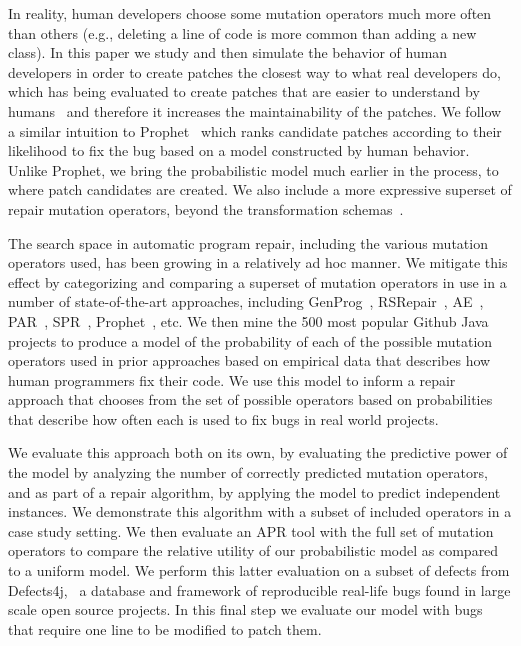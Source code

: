 \documentclass[conference]{IEEEtran}
\begin{document}
In reality, human developers choose some mutation operators 
much more often than 
others (e.g., deleting a line of code is more common than adding a new class). In this paper we study and then simulate the behavior of human developers in order 
to create patches the closest way to what real developers do, which has 
being evaluated to create patches that are easier to understand by
humans~\cite{kim2013} and 
therefore it increases the maintainability of the patches. We follow a similar
intuition to Prophet~\cite{long15} which ranks candidate patches
according to their likelihood to fix the bug based on a model constructed by
human behavior. Unlike Prophet, we bring the
probabilistic model much earlier in the process, to where
patch candidates are created. We also include a more expressive superset of repair mutation
operators, beyond the transformation schemas~\cite{fan15}.  

The search space in automatic program repair, including the various mutation
operators used, has been growing in a relatively ad hoc 
manner. We mitigate this effect by categorizing and comparing a superset of
mutation operators in use in a number of 
state-of-the-art approaches, including GenProg~\cite{legoues12}, RSRepair~\cite{Qi14}, AE~\cite{Weimer13}, PAR~\cite{kim2013}, 
SPR~\cite{fan15},
Prophet~\cite{Long2016}, etc.
We then mine
the 500 most popular Github Java projects to produce a model of the probability of
each of the possible mutation operators used in prior approaches based on 
empirical data that describes how human programmers fix their code.  We use this
model to inform a repair approach that chooses from the set of possible
operators based on 
probabilities that describe how often each is used
to fix bugs in real world projects. 

We evaluate this approach both on its own, by evaluating the predictive power of
the model by analyzing the number of correctly predicted mutation
operators,
and as part of a repair algorithm, by applying the model to predict independent
instances. We demonstrate this algorithm with a subset of included operators in
a case study setting.  We then evaluate an APR tool with the full set of mutation
operators to compare the relative utility of our probabilistic model as compared
to a uniform model.  We perform this latter evaluation on a subset of defects
from Defects4j,~\cite{just14} a 
database and framework of reproducible real-life bugs found in large scale open 
source projects. In this final step we evaluate our model with bugs that require 
one line to be modified to patch them. 
\end{document}
